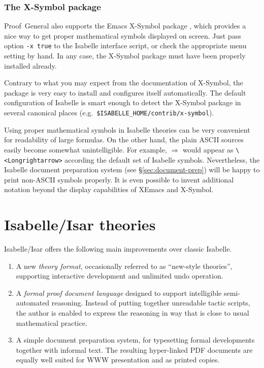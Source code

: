 \subsubsection{The X-Symbol package}

Proof~General also supports the Emacs X-Symbol package \cite{x-symbol}, which
provides a nice way to get proper mathematical symbols displayed on screen.
Just pass option \texttt{-x true} to the Isabelle interface script, or check
the appropriate menu setting by hand.  In any case, the X-Symbol package must
have been properly installed already.

Contrary to what you may expect from the documentation of X-Symbol, the
package is very easy to install and configures itself automatically.  The
default configuration of Isabelle is smart enough to detect the X-Symbol
package in several canonical places (e.g.\ 
\texttt{\$ISABELLE_HOME/contrib/x-symbol}).

\medskip

Using proper mathematical symbols in Isabelle theories can be very convenient
for readability of large formulas.  On the other hand, the plain ASCII sources
easily become somewhat unintelligible.  For example, $\Longrightarrow$ would
appear as \verb,\<Longrightarrow>, according the default set of Isabelle
symbols.  Nevertheless, the Isabelle document preparation system (see
\S\ref{sec:document-prep}) will be happy to print non-ASCII symbols properly.
It is even possible to invent additional notation beyond the display
capabilities of XEmacs and X-Symbol.


\section{Isabelle/Isar theories}

Isabelle/Isar offers the following main improvements over classic Isabelle.
\begin{enumerate}
\item A new \emph{theory format}, occasionally referred to as ``new-style
  theories'', supporting interactive development and unlimited undo operation.
\item A \emph{formal proof document language} designed to support intelligible
  semi-automated reasoning.  Instead of putting together unreadable tactic
  scripts, the author is enabled to express the reasoning in way that is close
  to usual mathematical practice.
\item A simple document preparation system, for typesetting formal
  developments together with informal text.  The resulting hyper-linked PDF
  documents are equally well suited for WWW presentation and as printed
  copies.
\end{enumerate}

